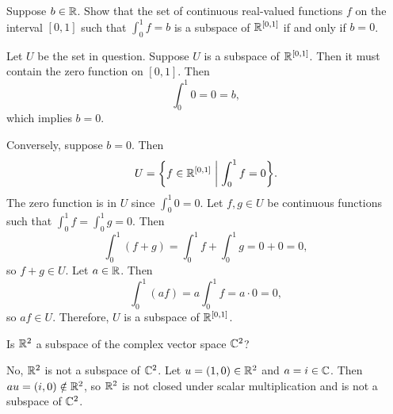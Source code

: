\begin{exc}
\begin{exercise}
Suppose $b\in\mathbb{R}$. Show that the set of continuous real-valued functions $f$ on
the interval $[0,1]$ such that $\int_0^1 f=b$ is a subspace of $\mathbb{R}^{[0,1]}$ if
and only if $b=0$.
\end{exercise}
\begin{solution}
Let $U$ be the set in question. Suppose $U$ is a subspace of $\mathbb{R}^{[0,1]}$. Then
it must contain the zero function on $[0,1]$. Then
\[ \int_0^1 0 = 0 = b, \]
which implies $b=0$.

Conversely, suppose $b=0$. Then
\[ U = \biggl\{f\in\mathbb{R}^{[0,1]} \biggm| \int_0^1 f=0\biggr\}. \]
The zero function is in $U$ since $\int_0^1 0=0$. Let $f,g\in U$ be continuous
functions such that $\int_0^1 f=\int_0^1 g=0$. Then
\[ \int_0^1 (f+g) = \int_0^1 f+\int_0^1 g = 0+0 = 0, \]
so $f+g\in U$. Let $a\in\mathbb{R}$. Then
\[ \int_0^1 (af) = a\int_0^1 f = a\cdot0 = 0, \]
so $af\in U$. Therefore, $U$ is a subspace of $\mathbb{R}^{[0,1]}$.
\end{solution}

\begin{exercise}
Is $\mathbb{R}^2$ a subspace of the complex vector space $\mathbb{C}^2$?
\end{exercise}
\begin{solution}
No, $\mathbb{R}^2$ is not a subspace of $\mathbb{C}^2$. Let $u=(1,0)\in\mathbb{R}^2$ and $a=i\in\mathbb{C}$.
Then $au=(i,0)\notin\mathbb{R}^2$, so $\mathbb{R}^2$ is not closed under scalar multiplication
and is not a subspace of $\mathbb{C}^2$.
\end{solution}


\end{exc}
